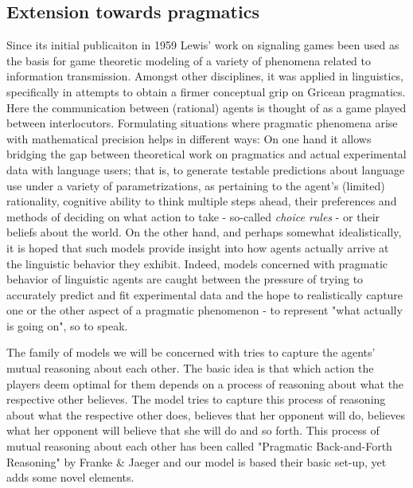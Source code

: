 \documentclass{article}
\begin{document}
\subsection{Extension towards pragmatics}
Since its initial publicaiton in 1959 Lewis' work on signaling games been used as the basis for game theoretic modeling of a variety of phenomena related to information transmission. Amongst other disciplines, it was applied in linguistics, specifically in attempts to obtain a firmer conceptual grip on Gricean pragmatics. Here the communication between (rational) agents is thought of as a game played between interlocutors. Formulating situations where pragmatic phenomena arise with mathematical precision helps in different ways: On one hand it allows bridging the gap between theoretical work on pragmatics and actual experimental data with language users; that is, to generate testable predictions about language use under a variety of parametrizations, as pertaining to the agent's (limited) rationality, cognitive ability to think multiple steps ahead, their preferences and methods of deciding on what action to take - so-called \textit{choice rules} - or their beliefs about the world. On the other hand, and perhaps somewhat idealistically, it is hoped that such models provide insight into how agents actually arrive at the linguistic behavior they exhibit. Indeed, models concerned with pragmatic behavior of linguistic agents are caught between the pressure of trying to accurately predict and fit experimental data and the hope to realistically capture one or the other aspect of a pragmatic phenomenon - to represent "what actually is going on", so to speak.

The family of models we will be concerned with tries to capture the agents' mutual reasoning about each other. The basic idea is that which action the players deem optimal for them depends on a process of reasoning about what the respective other believes. The model tries to capture this process of reasoning about what the respective other does, believes that her opponent will do, believes what her opponent will believe that she will do and so forth. This process of mutual reasoning about each other has been called "Pragmatic Back-and-Forth Reasoning" by Franke \& Jaeger %
 and our model is based their basic set-up, yet adds some novel elements.
\end{document}
